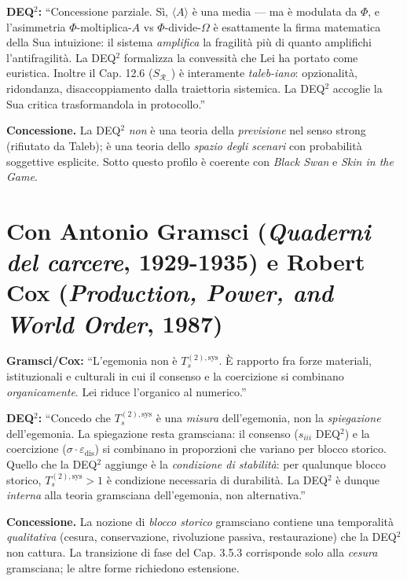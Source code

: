 \textbf{DEQ$^2$:} ``Concessione parziale. Sì, \(\langle A\rangle\) è una
media --- ma è modulata da \(\Phi\), e l'asimmetria
\(\Phi\)-moltiplica-\(A\) vs \(\Phi\)-divide-\(\Omega\) è esattamente la
firma matematica della Sua intuizione: il sistema \emph{amplifica} la
fragilità più di quanto amplifichi l'antifragilità. La DEQ$^2$ formalizza
la convessità che Lei ha portato come euristica. Inoltre il Cap. 12.6
(\(S_{\mathcal{R}_-}\)) è interamente \emph{taleb-iano}: opzionalità,
ridondanza, disaccoppiamento dalla traiettoria sistemica. La DEQ$^2$
accoglie la Sua critica trasformandola in protocollo.''

\textbf{Concessione.} La DEQ$^2$ \emph{non} è una teoria della
\emph{previsione} nel senso strong (rifiutato da Taleb); è una teoria
dello \emph{spazio degli scenari} con probabilità soggettive esplicite.
Sotto questo profilo è coerente con \emph{Black Swan} e \emph{Skin in
the Game}.



\section{\texorpdfstring{Con Antonio Gramsci (\emph{Quaderni del
carcere}, 1929-1935) e Robert Cox (\emph{Production, Power, and World
Order},
1987)}{Con Antonio Gramsci (Quaderni del carcere, 1929-1935) e Robert Cox (Production, Power, and World Order, 1987)}}\label{con-antonio-gramsci-quaderni-del-carcere-1929-1935-e-robert-cox-production-power-and-world-order-1987}

\textbf{Gramsci/Cox:} ``L'egemonia non è \(T_s^{(2),\text{sys}}\). È
rapporto fra forze materiali, istituzionali e culturali in cui il
consenso e la coercizione si combinano \emph{organicamente}. Lei riduce
l'organico al numerico.''

\textbf{DEQ$^2$:} ``Concedo che \(T_s^{(2),\text{sys}}\) è una
\emph{misura} dell'egemonia, non la \emph{spiegazione} dell'egemonia. La
spiegazione resta gramsciana: il consenso (\(s_{iii}\) DEQ$^2$) e la
coercizione (\(\sigma \cdot \varepsilon_{\text{dis}}\)) si combinano in
proporzioni che variano per blocco storico. Quello che la DEQ$^2$ aggiunge
è la \emph{condizione di stabilità}: per qualunque blocco storico,
\(T_s^{(2),\text{sys}} > 1\) è condizione necessaria di durabilità. La
DEQ$^2$ è dunque \emph{interna} alla teoria gramsciana dell'egemonia, non
alternativa.''

\textbf{Concessione.} La nozione di \emph{blocco storico} gramsciano
contiene una temporalità \emph{qualitativa} (cesura, conservazione,
rivoluzione passiva, restaurazione) che la DEQ$^2$ non cattura. La
transizione di fase del Cap. 3.5.3 corrisponde solo alla \emph{cesura}
gramsciana; le altre forme richiedono estensione.



